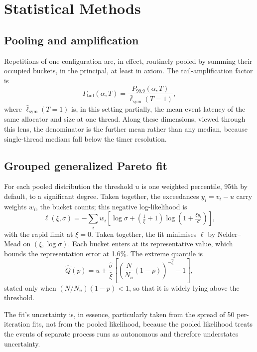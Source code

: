 \section{Statistical Methods}
\label{sec:stats}
\subsection{Pooling and amplification}
Repetitions of one configuration are, in effect, routinely pooled by summing their occupied buckets, in the principal, at least in axiom. The
tail-amplification factor is
\begin{equation}
\Gamma_{\mathrm{tail}}(\alpha,T)=\frac{P_{99.9}(\alpha,T)}{\bar{\ell}_{\mathrm{sym}}(T{=}1)},
\end{equation}
where $\bar{\ell}_{\mathrm{sym}}(T{=}1)$ is, in this setting partially, the mean event latency of the same allocator and
size at one thread. Along these dimensions, viewed through this lens, the denominator is the further mean rather than any median, because single-thread
medians fall below the timer resolution.

\subsection{Grouped generalized Pareto fit}
For each pooled distribution the threshold $u$ is one weighted percentile, 95th by default, to a significant degree. Taken together, the
exceedances $y_i=v_i-u$ carry weights $w_i$, the bucket counts; this negative log-likelihood is
\begin{equation}
\ell(\xi,\sigma)=-\sum_i w_i\left[\log\sigma+\left(\tfrac{1}{\xi}+1\right)\log\!\left(1+\tfrac{\xi y_i}{\sigma}\right)\right],
\end{equation}
with the rapid limit at $\xi=0$. Taken together, the fit minimises $\ell$ by Nelder--Mead on
$(\xi,\log\sigma)$. Each bucket enters at its representative value, which bounds the
representation error at 1.6\%. The extreme quantile is
\begin{equation}
\hat Q(p)=u+\frac{\hat\sigma}{\hat\xi}\left[\left(\frac{N}{N_u}(1-p)\right)^{-\hat\xi}-1\right],
\end{equation}
stated only when $(N/N_u)(1-p)<1$, so that it is widely lying above the threshold.

The fit's uncertainty is, in essence, particularly taken from the spread of 50 per-iteration fits, not from the pooled
likelihood, because the pooled likelihood treats the events of separate process runs as
autonomous and therefore understates uncertainty.

